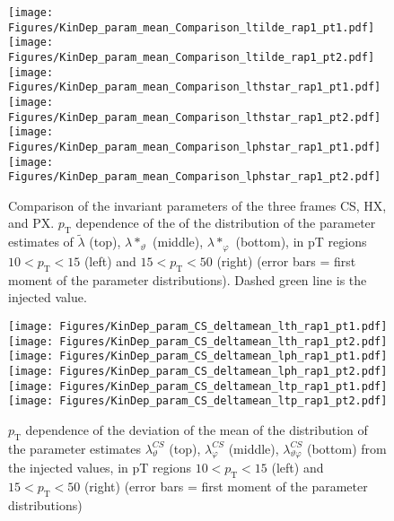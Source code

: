 \documentclass[12pt]{article}
\newcommand{\pT}{p_\mathrm{T}}
\newcommand{\lamtilde}{\tilde{\lambda}}
\newcommand{\lamthstar}{\lambda*_\vartheta}
\newcommand{\lamphstar}{\lambda*_\varphi}
\newcommand{\lamthCS}{\lambda^{\scriptscriptstyle CS}_\vartheta}
\newcommand{\lamphCS}{\lambda^{\scriptscriptstyle CS}_\varphi}
\newcommand{\lamthphCS}{\lambda^{\scriptscriptstyle CS}_{\vartheta \varphi}}
\begin{document}




\begin{figure}[htbp]
\centering
\texttt{[image: Figures/KinDep\_param\_mean\_Comparison\_ltilde\_rap1\_pt1.pdf]}
\texttt{[image: Figures/KinDep\_param\_mean\_Comparison\_ltilde\_rap1\_pt2.pdf]}
\texttt{[image: Figures/KinDep\_param\_mean\_Comparison\_lthstar\_rap1\_pt1.pdf]}
\texttt{[image: Figures/KinDep\_param\_mean\_Comparison\_lthstar\_rap1\_pt2.pdf]}
\texttt{[image: Figures/KinDep\_param\_mean\_Comparison\_lphstar\_rap1\_pt1.pdf]}
\texttt{[image: Figures/KinDep\_param\_mean\_Comparison\_lphstar\_rap1\_pt2.pdf]}
\caption{Comparison of the invariant parameters of the three frames CS, HX,
and PX. $\pT$ dependence of the of the distribution of the
parameter estimates of $\lamtilde$ (top), $\lamthstar$ (middle), $\lamphstar$ (bottom), in pT regions $10<\pT<15$ (left) and $15<\pT<50$ (right) (error bars = first moment of the parameter
distributions). Dashed green line is the injected value.}
\end{figure}
\clearpage











\begin{figure}[htbp]
\centering
\texttt{[image: Figures/KinDep\_param\_CS\_deltamean\_lth\_rap1\_pt1.pdf]}
\texttt{[image: Figures/KinDep\_param\_CS\_deltamean\_lth\_rap1\_pt2.pdf]}
\texttt{[image: Figures/KinDep\_param\_CS\_deltamean\_lph\_rap1\_pt1.pdf]}
\texttt{[image: Figures/KinDep\_param\_CS\_deltamean\_lph\_rap1\_pt2.pdf]}
\texttt{[image: Figures/KinDep\_param\_CS\_deltamean\_ltp\_rap1\_pt1.pdf]}
\texttt{[image: Figures/KinDep\_param\_CS\_deltamean\_ltp\_rap1\_pt2.pdf]}
\caption{$\pT$ dependence of the deviation of the mean of the distribution of
the parameter estimates $\lamthCS$ (top), $\lamphCS$ (middle), $\lamthphCS$
(bottom) from the injected values, in pT regions $10<\pT<15$ (left) and $15<\pT<50$ (right) (error bars = first moment of the parameter
distributions)}
\end{figure}
\clearpage
\end{document}

